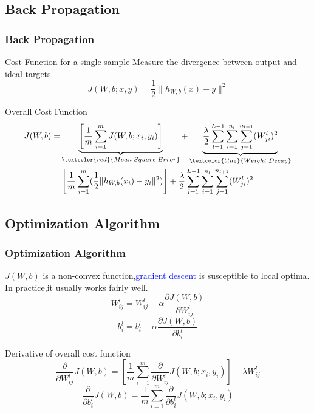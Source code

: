 \documentclass{beamer}
\begin{document}
\begin{CJK*}{UTF8}{gbsn}
\section{Back Propagation}
\begin{frame}\frametitle{Back Propagation}
\begin{exampleblock}{Cost Function for a single sample}
Measure the divergence between output and ideal targets.
\begin{equation}
J(W,b;x,y)=\frac{1}{2}\|h_{W,b}(x)-y\|^2
\end{equation}
\end{exampleblock}
\begin{exampleblock}{Overall Cost Function}
\begin{equation}
\begin{split}
J(W,b)=&\underbrace{\left[\frac{1}{m}\sum_{i=1}^mJ(W,b;x_i,y_i)\right]}_{\textcolor{red}{Mean\;Square\; Error}}+\underbrace{\frac{\lambda}{2}\sum_{l=1}^{L-1}\sum_{i=1}^{n_l}\sum_{j=1}^{n_{l+1}}(W_{ji}^l)^2}_{\textcolor{blue}{Weight\;Decay}}\\
&\left[\frac{1}{m}\sum_{i=1}^m(\frac{1}{2}\|h_{W,b}(x_i)-y_i\|^2)\right]+\frac{\lambda}{2}\sum_{l=1}^{L-1}\sum_{i=1}^{n_l}\sum_{j=1}^{n_{l+1}}(W_{ji}^l)^2
\end{split}
\end{equation}
\end{exampleblock}
\end{frame}

\subsection{Optimization Algorithm}
\begin{frame}\frametitle{Optimization Algorithm}
$J(W,b)$ is a non-convex function,\textcolor{blue}{gradient descent} is susceptible to local optima. In practice,it usually works fairly well.\\
\begin{equation}
W_{ij}^l=W_{ij}^l-\alpha\frac{\partial J(W,b)}{\partial W_{ij}^l}
\end{equation}
\begin{equation}
b_{i}^l=b_{i}^l-\alpha\frac{\partial J(W,b)}{\partial b_{i}^l}
\end{equation}

\begin{alertblock}{Derivative of overall cost function}
\begin{equation}
\frac{\partial}{\partial W_{ij}^l} J(W,b)=\left[\frac{1}{m}\sum_{i=1}^m\frac{\partial}{\partial W_{ij}^l} J(W,b;x_i,y_i)\right]+\lambda W_{ij}^l
\end{equation}
\begin{equation}
\frac{\partial}{\partial b_{i}^l} J(W,b)=\frac{1}{m}\sum_{i=1}^m\frac{\partial}{\partial b_{i}^l} J(W,b;x_i,y_i)
\end{equation}
\end{alertblock}
\end{frame}


\end{CJK*}
\end{document}
